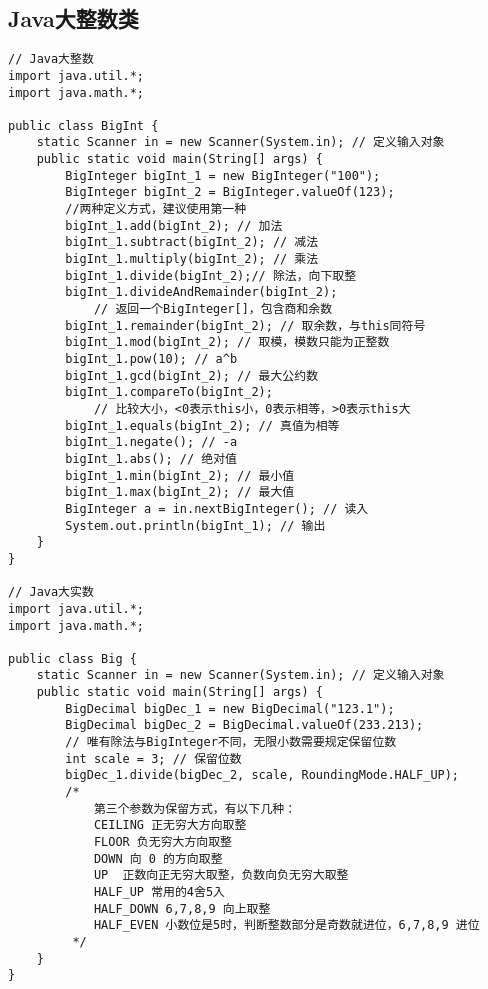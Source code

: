 \subsection{Java大整数类}
\begin{lstlisting}
// Java大整数
import java.util.*;
import java.math.*;

public class BigInt {
    static Scanner in = new Scanner(System.in); // 定义输入对象
    public static void main(String[] args) {
        BigInteger bigInt_1 = new BigInteger("100");
        BigInteger bigInt_2 = BigInteger.valueOf(123);
        //两种定义方式，建议使用第一种
        bigInt_1.add(bigInt_2); // 加法
        bigInt_1.subtract(bigInt_2); // 减法
        bigInt_1.multiply(bigInt_2); // 乘法
        bigInt_1.divide(bigInt_2);// 除法，向下取整
        bigInt_1.divideAndRemainder(bigInt_2);
            // 返回一个BigInteger[]，包含商和余数
        bigInt_1.remainder(bigInt_2); // 取余数，与this同符号
        bigInt_1.mod(bigInt_2); // 取模，模数只能为正整数
        bigInt_1.pow(10); // a^b
        bigInt_1.gcd(bigInt_2); // 最大公约数
        bigInt_1.compareTo(bigInt_2);
            // 比较大小，<0表示this小，0表示相等，>0表示this大
        bigInt_1.equals(bigInt_2); // 真值为相等
        bigInt_1.negate(); // -a
        bigInt_1.abs(); // 绝对值
        bigInt_1.min(bigInt_2); // 最小值
        bigInt_1.max(bigInt_2); // 最大值
        BigInteger a = in.nextBigInteger(); // 读入
        System.out.println(bigInt_1); // 输出
    }
}

// Java大实数
import java.util.*;
import java.math.*;

public class Big {
    static Scanner in = new Scanner(System.in); // 定义输入对象
    public static void main(String[] args) {
        BigDecimal bigDec_1 = new BigDecimal("123.1");
        BigDecimal bigDec_2 = BigDecimal.valueOf(233.213);
        // 唯有除法与BigInteger不同，无限小数需要规定保留位数
        int scale = 3; // 保留位数
        bigDec_1.divide(bigDec_2, scale, RoundingMode.HALF_UP);
        /*
            第三个参数为保留方式，有以下几种：
            CEILING 正无穷大方向取整
            FLOOR 负无穷大方向取整
            DOWN 向 0 的方向取整
            UP	正数向正无穷大取整，负数向负无穷大取整
            HALF_UP 常用的4舍5入
            HALF_DOWN 6,7,8,9 向上取整
            HALF_EVEN 小数位是5时，判断整数部分是奇数就进位，6,7,8,9 进位
         */
    }
}
\end{lstlisting}